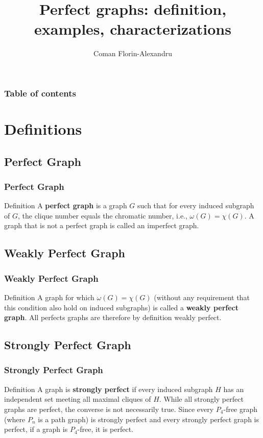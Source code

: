 \documentclass{beamer}
\begin{document}
\title{Perfect graphs: definition, examples, characterizations}  
\author{Coman Florin-Alexandru}

\begin{frame}
\titlepage
\end{frame}

\begin{frame}\frametitle{Table of contents}\tableofcontents
\end{frame}

\section{Definitions}
\subsection{Perfect Graph}
\begin{frame}\frametitle{Perfect Graph}
\begin{block}{Definition}
A \textbf{perfect graph} is a graph $G$ such that for every induced subgraph of $G$, the clique number equals the chromatic number, i.e., $\omega(G) = \chi(G)$. A graph that is not a perfect graph is called an imperfect graph.
\end{block}
\end{frame}

\subsection{Weakly Perfect Graph}
\begin{frame}\frametitle{Weakly Perfect Graph}
\begin{block}{Definition}
A graph for which $\omega(G) = \chi(G)$ (without any requirement that this condition also hold on induced subgraphs) is called a \textbf{weakly perfect graph}. All perfects graphs are therefore by definition weakly perfect.
\end{block}
\end{frame}

\subsection{Strongly Perfect Graph}
\begin{frame}\frametitle{Strongly Perfect Graph}
\begin{block}{Definition}
A graph is \textbf{strongly perfect} if every induced subgraph $H$ has an independent set meeting all maximal cliques of $H$. While all strongly perfect graphs are perfect, the converse is not necessarily true. Since every $P_4$-free graph (where $P_n$ is a path graph) is strongly perfect and every strongly perfect graph is perfect, if a graph is $P_4$-free, it is perfect.
\end{block}
\end{frame}
\end{document}
